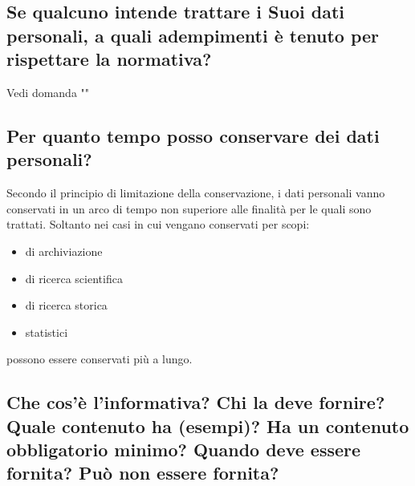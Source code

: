 \subsection{Se qualcuno intende trattare i Suoi dati personali, a quali adempimenti è tenuto per rispettare la normativa?}

Vedi domanda ""

\subsection{Per quanto tempo posso conservare dei dati personali?}

Secondo il principio di limitazione della conservazione, i dati personali vanno
conservati in un arco di tempo non superiore alle finalità per le quali sono
trattati.
\newline
Soltanto nei casi in cui vengano conservati per scopi:
\begin{itemize}
    \item di archiviazione
    \item di ricerca scientifica
    \item di ricerca storica
    \item statistici
\end{itemize}
possono essere conservati più a lungo.

\subsection{Che cos’è l’informativa? Chi la deve fornire? Quale contenuto ha
(esempi)? Ha un contenuto obbligatorio minimo? Quando deve essere fornita? Può
non essere fornita?}
\label{sec:informativa}

